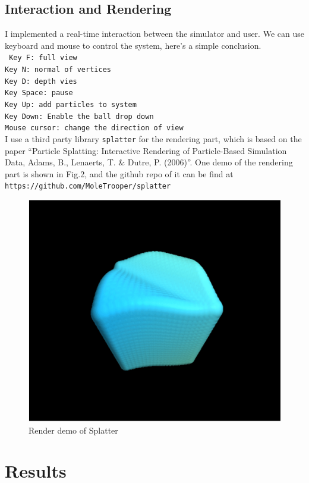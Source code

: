 \documentclass[acmtog]{acmart}
\begin{document}
\subsection{Interaction and Rendering}
I implemented a real-time interaction between the simulator and user. We can use keyboard and mouse 
to control the system, here's a simple conclusion.\\
\texttt{
Key F: full view\\
Key N: normal of vertices\\
Key D: depth vies\\
Key Space: pause\\
Key Up: add particles to system\\
Key Down: Enable the ball drop down\\
Mouse cursor: change the direction of view\\
}
I use a third party library \texttt{splatter} for the rendering part, which is based on the paper ``Particle Splatting: 
Interactive Rendering of Particle-Based Simulation Data, Adams, B., Lenaerts, T. \& Dutre, P. (2006)''.
One demo of the rendering part is shown in Fig.2, and the github repo of it can be find at \texttt{https://github.com/MoleTrooper/splatter}
\begin{figure}[H]
    \centering
    \includegraphics[scale=0.6]{../8.png}
    \caption{Render demo of Splatter}
\end{figure}

\section{Results}
\end{document}
